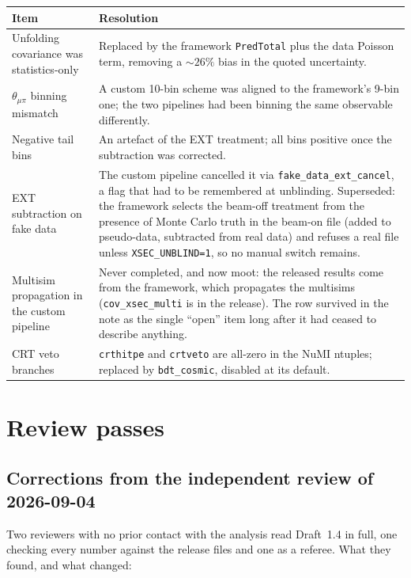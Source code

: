 \begin{center}
\small
\begin{tabular}{p{}p{}}
\toprule
Item & Resolution \\
\midrule
Unfolding covariance was statistics-only
  & Replaced by the framework \texttt{PredTotal} plus the data Poisson term, removing a
    ${\sim}26\%$ bias in the quoted uncertainty. \\
$\theta_{\mu\pi}$ binning mismatch
  & A custom 10-bin scheme was aligned to the framework's 9-bin one; the two pipelines had
    been binning the same observable differently. \\
Negative tail bins
  & An artefact of the EXT treatment; all bins positive once the subtraction was
    corrected. \\
EXT subtraction on fake data
  & The custom pipeline cancelled it via \texttt{fake\_data\_ext\_cancel}, a flag that had
    to be remembered at unblinding. Superseded: the framework selects the beam-off
    treatment from the presence of Monte Carlo truth in the beam-on file (added to
    pseudo-data, subtracted from real data) and refuses a real file unless
    \texttt{XSEC\_UNBLIND=1}, so no manual switch remains. \\
Multisim propagation in the custom pipeline
  & Never completed, and now moot: the released results come from the framework, which
    propagates the multisims (\texttt{cov\_xsec\_multi} is in the release).  The row
    survived in the note as the single ``open'' item long after it had ceased to describe
    anything. \\
CRT veto branches
  & \texttt{crthitpe} and \texttt{crtveto} are all-zero in the NuMI ntuples; replaced by
    \texttt{bdt\_cosmic}, disabled at its default. \\
\bottomrule
\end{tabular}
\end{center}

\section{Review passes}

\subsection{Corrections from the independent review of 2026-09-04}

Two reviewers with no prior contact with the analysis read Draft~1.4 in full, one checking
every number against the release files and one as a referee. What they found, and what
changed:


